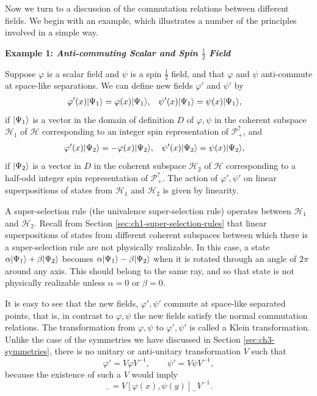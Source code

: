 Now we turn to a discussion of the commutation relations between
different fields.  We begin with an example, which illustrates a number of
the principles involved in a simple way.

\par\medskip\noindent\textbf{Example 1: \emph{Anti-commuting Scalar and Spin $\frac12$ Field}}
\par\smallskip

Suppose $\varphi$ is a scalar field and $\psi$ is a spin $\frac12$ field, and
that $\varphi$ and $\psi$ anti-commute at space-like separations.  We can
define new fields $\varphi'$ and $\psi'$ by
\begin{equation*}
\begin{aligned}
  \varphi'(x)\lvert \Psi_1\rangle&=\varphi(x)\lvert \Psi_1\rangle,
  &\psi'(x)\lvert \Psi_1\rangle&=\psi(x)\lvert \Psi_1\rangle,
\end{aligned}
\end{equation*}
if $\lvert \Psi_1\rangle$ is a vector in the domain of definition $D$ of $\varphi,\psi$
in the coherent subspace $\mathcal H_1$ of $\mathcal H$ corresponding to an
integer spin representation of $\mathcal P_+^\uparrow$, and
\begin{equation*}
\begin{aligned}
  \varphi'(x)\lvert \Psi_2\rangle&=-\varphi(x)\lvert \Psi_2\rangle,
  &\psi'(x)\lvert \Psi_2\rangle&=\psi(x)\lvert \Psi_2\rangle,
\end{aligned}
\end{equation*}
if $\lvert \Psi_2\rangle$ is a vector in $D$ in the coherent subspace $\mathcal H_2$
of $\mathcal H$ corresponding to a half-odd integer spin representation of
$\mathcal P_+^\uparrow$.  The action of $\varphi',\psi'$ on linear
superpositions of states from $\mathcal H_1$ and $\mathcal H_2$ is given by
linearity.

A super-selection rule (the univalence super-selection rule) operates between
$\mathcal H_1$ and $\mathcal H_2$.  Recall from Section \ref{sec:ch1-super-selection-rules} that linear
superpositions of states from different coherent subspaces between which
there is a super-selection rule are not physically realizable.  In this case,
a state $\alpha\lvert \Psi_1\rangle+\beta\lvert \Psi_2\rangle$ becomes
$\alpha\lvert \Psi_1\rangle-\beta\lvert \Psi_2\rangle$ when it is rotated through an angle of
$2\pi$ around any axis.  This should belong to the same ray, and so that state
is not physically realizable unless $\alpha=0$ or $\beta=0$.

It is easy to see that the new fields, $\varphi',\psi'$ commute at space-like
separated points, that is, in contrast to $\varphi,\psi$ the new fields satisfy
the normal commutation relations.  The transformation from $\varphi,\psi$ to
$\varphi',\psi'$ is called a Klein transformation.  Unlike the case of the
symmetries we have discussed in Section \ref{sec:ch3-symmetries}, there is no unitary or anti-unitary
transformation $V$ such that
\begin{equation*}
  \varphi'=V\varphi V^{-1},
  \qquad
  \psi'=V\psi V^{-1},
\end{equation*}
because the existence of such a $V$ would imply
\begin{equation*}
  [\varphi'(x),\psi'(y)]_-=V[\varphi(x),\psi(y)]_-V^{-1}.
\end{equation*}

